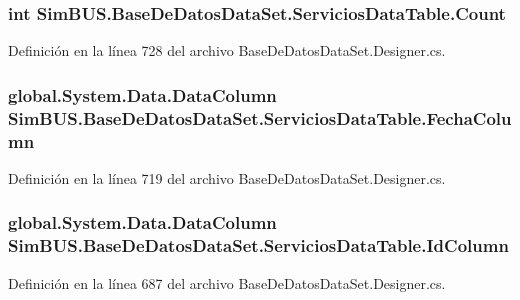 \subsubsection[{Count}]{\setlength{\rightskip}{0pt plus 5cm}int Sim\-B\-U\-S.\-Base\-De\-Datos\-Data\-Set.\-Servicios\-Data\-Table.\-Count\hspace{0.3cm}{\ttfamily [get]}}\label{class_sim_b_u_s_1_1_base_de_datos_data_set_1_1_servicios_data_table_ad2155ac8bbdd01db800ebf0777c81ae0}


Definición en la línea 728 del archivo Base\-De\-Datos\-Data\-Set.\-Designer.\-cs.

\subsubsection[{Fecha\-Column}]{\setlength{\rightskip}{0pt plus 5cm}global.\-System.\-Data.\-Data\-Column Sim\-B\-U\-S.\-Base\-De\-Datos\-Data\-Set.\-Servicios\-Data\-Table.\-Fecha\-Column\hspace{0.3cm}{\ttfamily [get]}}\label{class_sim_b_u_s_1_1_base_de_datos_data_set_1_1_servicios_data_table_acb12670ff25d832f48eebb51354d7d7c}


Definición en la línea 719 del archivo Base\-De\-Datos\-Data\-Set.\-Designer.\-cs.

\subsubsection[{Id\-Column}]{\setlength{\rightskip}{0pt plus 5cm}global.\-System.\-Data.\-Data\-Column Sim\-B\-U\-S.\-Base\-De\-Datos\-Data\-Set.\-Servicios\-Data\-Table.\-Id\-Column\hspace{0.3cm}{\ttfamily [get]}}\label{class_sim_b_u_s_1_1_base_de_datos_data_set_1_1_servicios_data_table_a348098d6ea19c9a547159eb3721a4dd1}


Definición en la línea 687 del archivo Base\-De\-Datos\-Data\-Set.\-Designer.\-cs.

